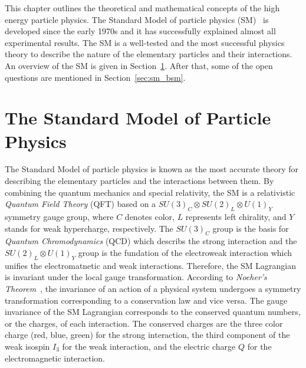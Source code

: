 This chapter outlines the theoretical and mathematical concepts of the high energy particle physics.
The Standard Model of particle physics (SM)~\cite{BF02726525,Glashow,PhysRevLett.19.1264,Herrero:1998eq,CBO9780511791406} is developed since the early 1970s and it has successfully explained almost all experimental results.
The SM is a well-tested and the most successful physics theory to describe the nature of the elementary particles and their interactions.
An overview of the SM is given in Section~\ref{sec:sm}.
After that, some of the open questions are mentioned in Section~\ref{sec:sm_bsm}.


\section{The Standard Model of Particle Physics}
\label{sec:sm}
The Standard Model of particle physics is known as the most accurate theory for describing the elementary particles and the interactions between them.
By combining the quantum mechanics and special relativity, the SM is a relativistic \textit{Quantum Field Theory} (QFT) based on a $SU(3)_{C} \otimes SU(2)_{L} \otimes U(1)_{Y}$ symmetry gauge group, where $C$ denotes color, $L$ represents left chirality, and $Y$ stands for weak hypercharge, respectively.
The $SU(3)_{C}$ group is the basis for \textit{Quantum Chromodynamics} (QCD) which describs the strong interaction and the $SU(2)_{L} \otimes U(1)_{Y}$ group is the fundation of the electroweak interaction which unifies the electromatnetic and weak interactions.
Therefore, the SM Lagrangian is invariant under the local gauge transformation.
According to \textit{Noeher's Theorem}~\cite{00411457108231446}, the invariance of an action of a physical system undergoes a symmetry transformation corresponding to a conservation law and vice versa. 
The gauge invariance of the SM Lagrangian corresponds to the conserved quantum numbers, or the charges, of each interaction.
The conserved charges are the three color charge (red, blue, green) for the strong interaction, the third component of the weak isospin $I_{3}$ for the weak interaction, and the electric charge $Q$ for the electromagnetic interaction.


